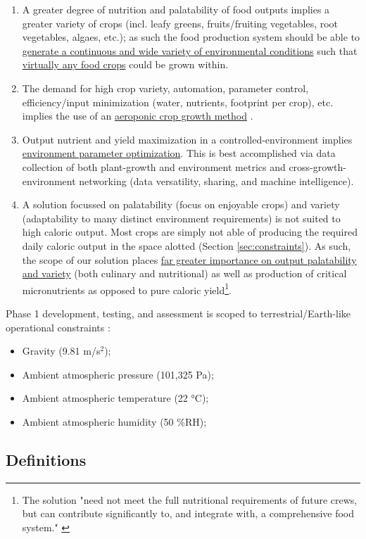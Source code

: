 \documentclass{report}
\begin{document}
\begin{enumerate}[label=SC\arabic*., ref=SC\arabic*]
\newpage
\item \label{sc:5} A greater degree of nutrition and palatability of food outputs implies a greater variety of crops (incl. leafy greens, fruits/fruiting vegetables, root vegetables, algaes, etc.); as such the food production system should be able to \uline{generate a continuous and wide variety of environmental conditions} such that \uline{virtually any food crops} could be grown within.
\item \label{sc:6} The demand for high crop variety, automation, parameter control, efficiency/input minimization (water, nutrients, footprint per crop), etc. implies the use of an \uline{aeroponic crop growth method} \cite{spinoff}.
\item \label{sc:7} Output nutrient and yield maximization in a controlled-environment implies \uline{environment parameter optimization}. 
    This is best accomplished via data collection of both plant-growth and environment metrics and cross-growth-environment networking (data versatility, sharing, and machine intelligence).
\item \label{sc:8} A solution focussed on palatability (focus on enjoyable crops) and variety (adaptability to many distinct environment requirements) is not suited to high caloric output. 
    Most crops are simply not able of producing the required daily caloric output in the space alotted (Section \ref{sec:constraints}). 
    As such, the scope of our solution places \uline{far greater importance on output palatability and variety} (both culinary and nutritional) as well as production of critical micronutrients as opposed to pure caloric 
    yield\footnote{The solution "need not meet the full nutritional requirements of future crews, but can contribute significantly to, and integrate with, a comprehensive food system." \cite{applicantguide}}.
\end{enumerate}
Phase 1 development, testing, and assessment is scoped to terrestrial/Earth-like operational constraints \cite{applicantguide}:
\begin{itemize}
    \item Gravity (9.81 m/s${}^2$);
    \item Ambient atmospheric pressure (101,325 Pa);
    \item Ambient atmospheric temperature (22 °C);
    \item Ambient atmospheric humidity (50 \%RH);
\end{itemize}

\newpage
\subsection{Definitions}
\label{sec:definitions}
\end{document}
